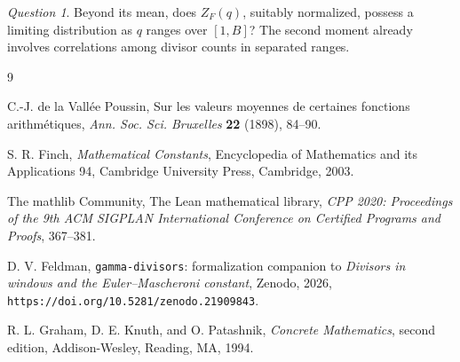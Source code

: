 \documentclass[11pt]{amsart}
\theoremstyle{remark}
\newtheorem{question}[theorem]{Question}
\begin{document}
\begin{question}\label{q:distribution}
Beyond its mean, does $Z_{F}(q)$, suitably normalized, possess a
limiting distribution as $q$ ranges over $[1,B]$?  The second moment
already involves correlations among divisor counts in separated
ranges.
\end{question}

\begin{thebibliography}{9}

C.-J. de la Vall\'ee Poussin,
Sur les valeurs moyennes de certaines fonctions arithm\'etiques,
\emph{Ann. Soc. Sci. Bruxelles} \textbf{22} (1898), 84--90.

S. R. Finch,
\emph{Mathematical Constants},
Encyclopedia of Mathematics and its Applications 94,
Cambridge University Press, Cambridge, 2003.

The mathlib Community,
The Lean mathematical library,
\emph{CPP 2020: Proceedings of the 9th ACM SIGPLAN International
Conference on Certified Programs and Proofs}, 367--381.

D. V. Feldman,
\texttt{gamma-divisors}: formalization companion to
\emph{Divisors in windows and the Euler--Mascheroni constant},
Zenodo, 2026, \texttt{https://doi.org/10.5281/zenodo.21909843}.

R. L. Graham, D. E. Knuth, and O. Patashnik,
\emph{Concrete Mathematics}, second edition,
Addison-Wesley, Reading, MA, 1994.

\end{thebibliography}
\end{document}
